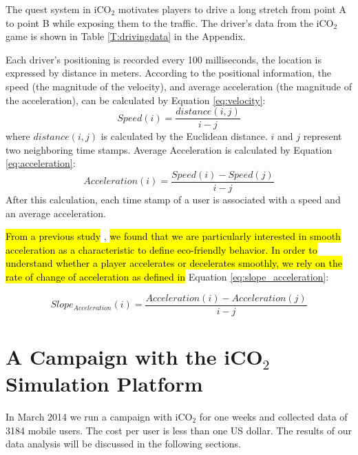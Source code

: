 \documentclass[preprint,authoryear,12pt]{elsarticle}
\newcommand{\hlc}[2][yellow]{ {\sethlcolor{#1} \hl{#2}} }
\begin{document}
The quest system in iCO$_2$ motivates players to drive a long stretch from point A to point B while exposing them to the traffic. The driver's data from the iCO$_2$ game is shown in Table \ref{T:drivingdata} in the Appendix.


 Each driver's positioning is recorded every 100 milliseconds, the location is expressed by distance in meters. According to the positional information, the speed (the magnitude of the velocity), and average acceleration (the magnitude of the acceleration), can be calculated by Equation \ref{eq:velocity}:
\begin{equation}\label{eq:velocity}
Speed(i) = \frac{distance(i,j)}{i-j}
\end{equation}
where $distance(i,j)$ is calculated by the Euclidean distance. $i$ and $j$ represent two neighboring time stamps. Average Acceleration is calculated by Equation \ref{eq:acceleration}:
\begin{equation}\label{eq:acceleration}
Acceleration(i) = \frac{Speed(i) - Speed(j)}{i-j}
\end{equation}
After this calculation, each time stamp of a user is associated with a speed and an average acceleration.

\hlc[green]{
From a previous  study
}
\cite{prendingeroliveira2014}, 
\hlc[green]{we found that we are particularly interested in smooth acceleration as a characteristic to define eco-friendly behavior. In order to understand whether a player accelerates or decelerates smoothly, we rely on the rate of change of acceleration as defined in 
}
	Equation \ref{eq:slope_acceleration}:



\begin{equation}\label{eq:slope_acceleration}
Slope_{Acceleration}(i) = \frac{Acceleration(i) - Acceleration(j)}{i-j}
\end{equation}

\section{A Campaign with the iCO$_2$ Simulation Platform}\label{sec:campaign}


In March 2014 we run a campaign with iCO$_2$ for one weeks and collected data of 3184 mobile users. The cost per user is less than one US dollar.
The results of our data analysis will be discussed in the following sections.
\end{document}
